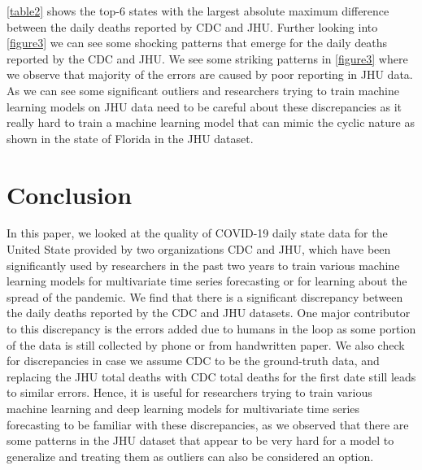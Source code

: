 \documentclass[11pt,twocolumn,letterpaper]{article}
\begin{document}
\cref{table2} shows the top-6 states with the largest absolute maximum difference between the daily deaths reported by CDC and JHU. Further looking into \cref{figure3} we can see some shocking patterns that emerge for the daily deaths reported by the CDC and JHU. We see some striking patterns in \cref{figure3} where we observe that majority of the errors are caused by poor reporting in JHU data. As we can see some significant outliers and researchers trying to train machine learning models on JHU data need to be careful about these discrepancies as it really hard to train a machine learning model that can mimic the cyclic nature as shown in the state of Florida in the JHU dataset.

\section{Conclusion}

In this paper, we looked at the quality of COVID-19 daily state data for the United State provided by two organizations CDC and JHU, which have been significantly used by researchers in the past two years to train various machine learning models for multivariate time series forecasting or for learning about the spread of the pandemic. We find that there is a significant discrepancy between the daily deaths reported by the CDC and JHU datasets. One major contributor to this discrepancy is the errors added due to humans in the loop as some portion of the data is still collected by phone or from handwritten paper. We also check for discrepancies in case we assume CDC to be the ground-truth data, and replacing the JHU total deaths with CDC total deaths for the first date still leads to similar errors. Hence, it is useful for researchers trying to train various machine learning and deep learning models for multivariate time series forecasting to be familiar with these discrepancies, as we observed that there are some patterns in the JHU dataset that appear to be very hard for a model to generalize and treating them as outliers can also be considered an option.

{\small


}
\end{document}
